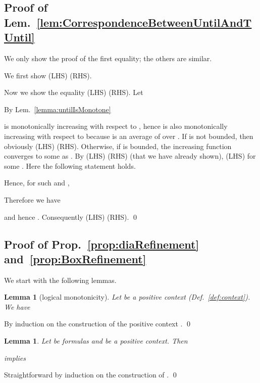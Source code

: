 \documentclass[envcountsect,orivec]{llncs} \usepackage{etex} \usepackage[]{graphicx}
\newtheorem{mylemma}[mytheorem]{Lemma}
\def\myqed{\qed}
\begin{document}
\subsection{Proof of Lem.~\ref{lem:CorrespondenceBetweenUntilAndTUntil}}
\begin{myproof}
  We only show the proof of the first equality; the others are similar.
  
  We  first show (LHS)  (RHS).
  
  Now we show the equality (LHS)  (RHS).
  Let 
  
  By Lem.~\ref{lemma:untilIsMonotone}
  
  is monotonically increasing with respect to ,
  hence  is also monotonically increasing with respect to 
  because  is an average of 
  over .
  If  is not bounded, then obviously (LHS)  (RHS).
  Otherwise, if  is bounded,
the increasing function 
  converges to some  as .
By (LHS)  (RHS) (that we have already shown),
   (LHS) for some .
  Here the following statement holds.
  
  Hence, for such  and ,
  
  Therefore we have
  
  and hence .
  Consequently
  (LHS)  (RHS).
  \myqed
\end{myproof}

\subsection{Proof of Prop.~\ref{prop:diaRefinement} and~\ref{prop:BoxRefinement}}
 We start with the following lemmas.
\begin{mylemma}[logical monotonicity]
  \label{lem:monotonicity}
  Let  be a positive context (Def.~\ref{def:context}). We have

\end{mylemma}
\begin{myproof}
  By induction on the construction of the positive context .
  \myqed
\end{myproof}


\begin{mylemma}\label{lem:zeroCorrespondence}
  Let  be  formulas and  be a positive context. Then
  
  implies
  
\end{mylemma}
\begin{myproof}
  Straightforward by induction on the construction of .
  \myqed
\end{myproof}
\end{document}
